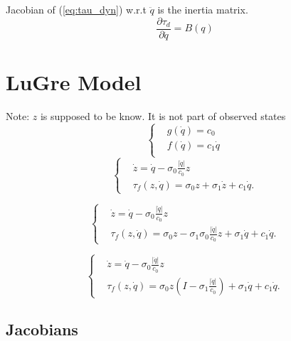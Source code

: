 \documentclass{paper}
\begin{document}
Jacobian of (\ref{eq:tau_dyn}) w.r.t $\ddot{q}$ is the inertia matrix.
\begin{equation}
\frac{\partial\tau_d}{\partial \ddot{q}}=B(q)
\end{equation}



\section{LuGre Model}
Note: $z$ is supposed to be know. It is not part of observed states
\begin{equation}
\left\lbrace
\begin{aligned}
& g(\dot{q}) = c_0\\
& f(\dot{q}) = c_1 \dot{q}\\
\end{aligned}
\right.
\end{equation}
\begin{equation}
\left\lbrace
\begin{aligned}
& \dot{z} = \dot{q} - \sigma_0 \frac{\left|\dot{q}\right|}{c_0} z\\
& \tau_{f}(z,\dot{q}) = \sigma_0 z  + \sigma_1 \dot{z} + c_1\dot{q}.
\end{aligned}
\right.
\end{equation}

\begin{equation}
\left\lbrace
\begin{aligned}
& \dot{z} = \dot{q} - \sigma_0 \frac{\left|\dot{q}\right|}{c_0} z\\
& \tau_{f}(z,\dot{q}) = \sigma_0 z -\sigma_1\sigma_0 \frac{\left|\dot{q}\right|}{c_0} z + \sigma_1 \dot{q} + c_1\dot{q}.
\end{aligned}
\right.
\end{equation}


\begin{equation}
\left\lbrace
\begin{aligned}
& \dot{z} = \dot{q} - \sigma_0 \frac{\left|\dot{q}\right|}{c_0} z\\
& \tau_{f}(z,\dot{q}) = \sigma_0 z\left(I -\sigma_1 \frac{\left|\dot{q}\right|}{c_0}\right) + \sigma_1 \dot{q} + c_1\dot{q}.
\end{aligned}
\right.
\end{equation}



\subsection{Jacobians}
\end{document}
